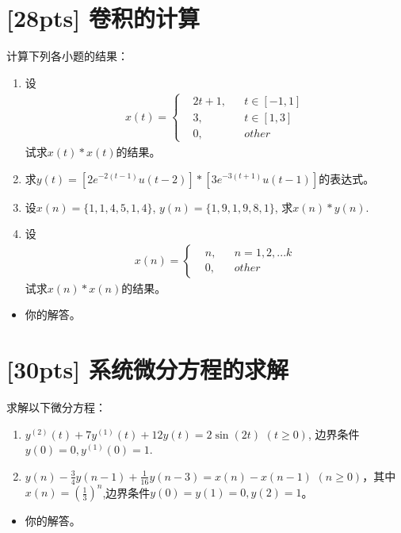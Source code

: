 \documentclass[a4paper,UTF8]{article}
\numberwithin{equation}{section}
\begin{document}
\section{[28pts] 卷积的计算 }
计算下列各小题的结果：
\begin{enumerate}[(1)]
	\item 设
	\begin{equation*}
        \begin{aligned}
        x(t)=\left\{
        \begin{aligned}
        & 2t+1, && t\in[-1,1]\\
        & 3, && t\in[1,3]\\
        & 0, && other
        \end{aligned}
        \right.
        \end{aligned}
    \end{equation*}
    试求$x(t)*x(t)$的结果。
	\item 求$y(t)=[2e^{-2(t-1)}u(t-2)]*[3e^{-3(t+1)}u(t-1)]$的表达式。
	\item 设$x(n)=\{1,1,4,5,1,4\}$, $y(n)=\{1,9,1,9,8,1\}$, 求$x(n)*y(n)$.
	\item 设
	\begin{equation*}
        \begin{aligned}
        x(n)=\left\{
        \begin{aligned}
        & n, && n=1,2,...k\\
        & 0, && other
        \end{aligned}
        \right.
        \end{aligned}
    \end{equation*}
    试求$x(n)*x(n)$的结果。
\end{enumerate}

\begin{framed}
\begin{spacing}{1.5}
    \begin{itemize}
        \item 你的解答。
    \end{itemize}
\end{spacing}
\end{framed}


\newpage
\section{[30pts] 系统微分方程的求解 }
求解以下微分方程：
\begin{enumerate}[(1)]
	\item $y^{(2)}(t)+7y^{(1)}(t)+12y(t)=2\sin(2t)$ $(t\geqslant0)$, 边界条件$y(0)=0,y^{(1)}(0)=1$.
	\item $y(n)-\displaystyle\frac{3}{4}y(n-1)+\frac{1}{16}y(n-3)=x(n)-x(n-1)$ $(n\geqslant0)$，其中$x(n)=\displaystyle\left(\frac{1}{3}\right)^n$,边界条件$y(0)=y(1)=0,y(2)=1$。
\end{enumerate}

\begin{framed}
\begin{spacing}{1.5}
    \begin{itemize}
        \item 你的解答。
    \end{itemize}
\end{spacing}
\end{framed}


\newpage
\end{document}
